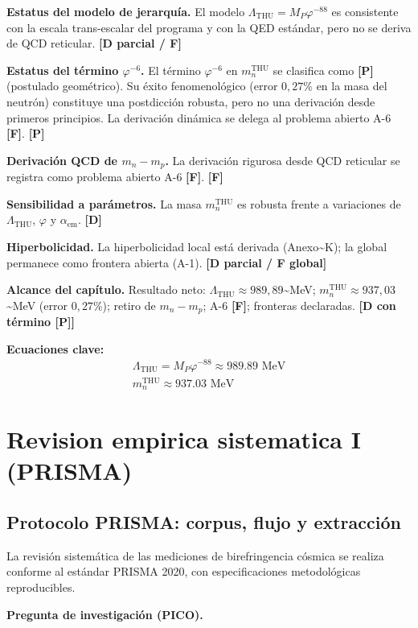 ﻿\documentclass[11pt,letterpaper]{article}
\begin{document}
\textbf{Estatus del modelo de jerarquía.} El modelo $\Lambda_{\text{THU}} = M_P\varphi^{-88}$ es consistente con la escala trans-escalar del programa y con la QED estándar, pero no se deriva de QCD reticular. \textbf{[D parcial / F]}

\textbf{Estatus del término $\varphi^{-6}$.} El término $\varphi^{-6}$ en $m_n^{\text{THU}}$ se clasifica como \textbf{[P]} (postulado geométrico). Su éxito fenomenológico (error $0{,}27\%$ en la masa del neutrón) constituye una postdicción robusta, pero no una derivación desde primeros principios. La derivación dinámica se delega al problema abierto A-6 \textbf{[F]}. \textbf{[P]}

\textbf{Derivación QCD de $m_n - m_p$.} La derivación rigurosa desde QCD reticular se registra como problema abierto A-6 \textbf{[F]}. \textbf{[F]}

\textbf{Sensibilidad a parámetros.} La masa $m_n^{\text{THU}}$ es robusta frente a variaciones de $\Lambda_{\text{THU}}$, $\varphi$ y $\alpha_{\text{em}}$. \textbf{[D]}

\textbf{Hiperbolicidad.} La hiperbolicidad local está derivada (Anexo\textasciitilde{}K); la global permanece como frontera abierta (A-1). \textbf{[D parcial / F global]}

\textbf{Alcance del capítulo.} Resultado neto: $\Lambda_{\text{THU}} \approx 989{,}89$\textasciitilde{}MeV; $m_n^{\text{THU}} \approx 937{,}03$\textasciitilde{}MeV (error $0{,}27\%$); retiro de $m_n - m_p$; A-6 \textbf{[F]}; fronteras declaradas. \textbf{[D con término [P]]}

\textbf{Ecuaciones clave:}
\begin{align*}
    \Lambda_{\mathrm{THU}} = M_P \varphi^{-88} \approx 989.89 \text{ MeV} \\
    m_n^{\mathrm{THU}} \approx 937.03 \text{ MeV}
\end{align*}
\section{Revision empirica sistematica I (PRISMA)}
\subsection{Protocolo PRISMA: corpus, flujo y extracción}
La revisión sistemática de las mediciones de birefringencia cósmica se realiza conforme al estándar PRISMA 2020, con especificaciones metodológicas reproducibles.

\textbf{Pregunta de investigación (PICO).}
\end{document}
